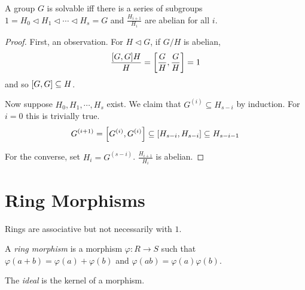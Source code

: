 \documentclass[a4paper,twoside,master.tex]{subfiles}
\begin{document}
\begin{claim}
    A group $ G $ is solvable iff there is a series of subgroups $ 1 = H_0 \triangleleft H_1 \triangleleft \cdots \triangleleft H_s = G $ and $ \frac{H_{i+1}}{H_i} $ are abelian for all $ i $. 
\end{claim}
\begin{proof}
    First, an observation. For $ H \triangleleft G $, if $ G/H $ is abelian,
    \begin{equation}
        \frac{\comm{G}{G} H}{H} = \comm{\frac{G}{H}}{\frac{G}{H}} = 1
    \end{equation}
    and so $ \comm{G}{G} \subseteq H $.

    Now suppose $ H_0, H_1, \cdots, H_s $ exist. We claim that $ G^{(i)} \subseteq H_{s-i} $ by induction. For $ i = 0 $ this is trivially true.
    \begin{equation}
        G^{(i+1)} = \comm{G^{(i)}}{G^{(i)}} \subseteq \comm{H_{s-i}}{H_{s-i}} \subseteq H_{s-i-1}
    \end{equation}

    For the converse, set $ H_i = G^{(s-i)} $. $ \frac{H_{i+1}}{H_{i}} $ is abelian.
\end{proof}

\section{Ring Morphisms}
\label{sec:ring_morphisms}

Rings are associative but not necessarily with $ 1 $.
\begin{definition}
    A \textit{ring morphism} is a morphism $ \varphi \colon R \to S $ such that $ \varphi(a+b) = \varphi(a) + \varphi(b) $ and $ \varphi(ab) = \varphi(a) \varphi(b) $.
\end{definition}

\begin{definition}
    The \textit{ideal} is the kernel of a morphism.
\end{definition}
\end{document}
